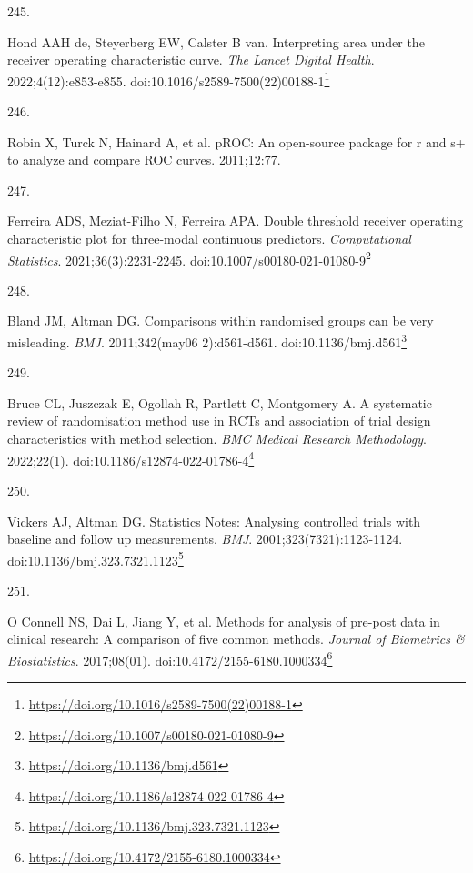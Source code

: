 \documentclass[
  a4paper,
]{book}
\newlength{\cslhangindent}
\newlength{\csllabelwidth}
\newlength{\cslentryspacingunit} %
\newenvironment{CSLReferences}[2] %
 {%
  \setlength{\parindent}{0pt}
  \ifodd #1
  \let\oldpar\par
  \def\par{\hangindent=\cslhangindent\oldpar}
  \fi
  \setlength{\parskip}{#2\cslentryspacingunit}
 }%
 {}
\newcommand{\CSLLeftMargin}[1]{\parbox[t]{\csllabelwidth}{#1}}
\newcommand{\CSLRightInline}[1]{\parbox[t]{\linewidth - \csllabelwidth}{#1}\break}
\renewcommand{\href}[2]{#2\footnote{\url{#1}}}
\begin{document}
\begin{CSLReferences}{0}{0}
\leavevmode{}%
\CSLLeftMargin{245. }%
\CSLRightInline{Hond AAH de, Steyerberg EW, Calster B van. Interpreting area under the receiver operating characteristic curve. \emph{The Lancet Digital Health}. 2022;4(12):e853-e855. doi:\href{https://doi.org/10.1016/s2589-7500(22)00188-1}{10.1016/s2589-7500(22)00188-1}}

\leavevmode{}%
\CSLLeftMargin{246. }%
\CSLRightInline{Robin X, Turck N, Hainard A, et al. pROC: An open-source package for r and s+ to analyze and compare ROC curves. 2011;12:77.}

\leavevmode{}%
\CSLLeftMargin{247. }%
\CSLRightInline{Ferreira ADS, Meziat-Filho N, Ferreira APA. Double threshold receiver operating characteristic plot for three-modal continuous predictors. \emph{Computational Statistics}. 2021;36(3):2231-2245. doi:\href{https://doi.org/10.1007/s00180-021-01080-9}{10.1007/s00180-021-01080-9}}

\leavevmode{}%
\CSLLeftMargin{248. }%
\CSLRightInline{Bland JM, Altman DG. Comparisons within randomised groups can be very misleading. \emph{BMJ}. 2011;342(may06 2):d561-d561. doi:\href{https://doi.org/10.1136/bmj.d561}{10.1136/bmj.d561}}

\leavevmode{}%
\CSLLeftMargin{249. }%
\CSLRightInline{Bruce CL, Juszczak E, Ogollah R, Partlett C, Montgomery A. A systematic review of randomisation method use in RCTs and association of trial design characteristics with method selection. \emph{BMC Medical Research Methodology}. 2022;22(1). doi:\href{https://doi.org/10.1186/s12874-022-01786-4}{10.1186/s12874-022-01786-4}}

\leavevmode{}%
\CSLLeftMargin{250. }%
\CSLRightInline{Vickers AJ, Altman DG. Statistics Notes: Analysing controlled trials with baseline and follow up measurements. \emph{BMJ}. 2001;323(7321):1123-1124. doi:\href{https://doi.org/10.1136/bmj.323.7321.1123}{10.1136/bmj.323.7321.1123}}

\leavevmode{}%
\CSLLeftMargin{251. }%
\CSLRightInline{O Connell NS, Dai L, Jiang Y, et al. Methods for analysis of pre-post data in clinical research: A comparison of five common methods. \emph{Journal of Biometrics \& Biostatistics}. 2017;08(01). doi:\href{https://doi.org/10.4172/2155-6180.1000334}{10.4172/2155-6180.1000334}}


\end{CSLReferences}
\end{document}
